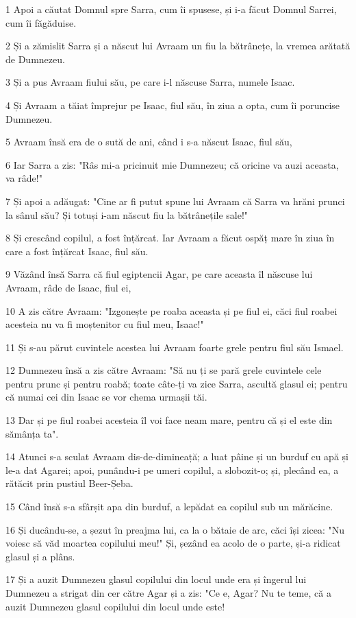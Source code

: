 \par 1 Apoi a căutat Domnul spre Sarra, cum îi spusese, și i-a făcut Domnul Sarrei, cum îi făgăduise.
\par 2 Și a zămislit Sarra și a născut lui Avraam un fiu la bătrânețe, la vremea arătată de Dumnezeu.
\par 3 Și a pus Avraam fiului său, pe care i-l născuse Sarra, numele Isaac.
\par 4 Și Avraam a tăiat împrejur pe Isaac, fiul său, în ziua a opta, cum îi poruncise Dumnezeu.
\par 5 Avraam însă era de o sută de ani, când i s-a născut Isaac, fiul său,
\par 6 Iar Sarra a zis: "Râs mi-a pricinuit mie Dumnezeu; că oricine va auzi aceasta, va râde!"
\par 7 Și apoi a adăugat: "Cine ar fi putut spune lui Avraam că Sarra va hrăni prunci la sânul său? Și totuși i-am născut fiu la bătrânețile sale!"
\par 8 Și crescând copilul, a fost înțărcat. Iar Avraam a făcut ospăț mare în ziua în care a fost înțărcat Isaac, fiul său.
\par 9 Văzând însă Sarra că fiul egiptencii Agar, pe care aceasta îl născuse lui Avraam, râde de Isaac, fiul ei,
\par 10 A zis către Avraam: "Izgonește pe roaba aceasta și pe fiul ei, căci fiul roabei acesteia nu va fi moștenitor cu fiul meu, Isaac!"
\par 11 Și s-au părut cuvintele acestea lui Avraam foarte grele pentru fiul său Ismael.
\par 12 Dumnezeu însă a zis către Avraam: "Să nu ți se pară grele cuvintele cele pentru prunc și pentru roabă; toate câte-ți va zice Sarra, ascultă glasul ei; pentru că numai cei din Isaac se vor chema urmașii tăi.
\par 13 Dar și pe fiul roabei acesteia îl voi face neam mare, pentru că și el este din sămânța ta".
\par 14 Atunci s-a sculat Avraam dis-de-dimineață; a luat pâine și un burduf cu apă și le-a dat Agarei; apoi, punându-i pe umeri copilul, a slobozit-o; și, plecând ea, a rătăcit prin pustiul Beer-Șeba.
\par 15 Când însă s-a sfârșit apa din burduf, a lepădat ea copilul sub un mărăcine.
\par 16 Și ducându-se, a șezut în preajma lui, ca la o bătaie de arc, căci își zicea: "Nu voiesc să văd moartea copilului meu!" Și, șezând ea acolo de o parte, și-a ridicat glasul și a plâns.
\par 17 Și a auzit Dumnezeu glasul copilului din locul unde era și îngerul lui Dumnezeu a strigat din cer către Agar și a zis: "Ce e, Agar? Nu te teme, că a auzit Dumnezeu glasul copilului din locul unde este!
